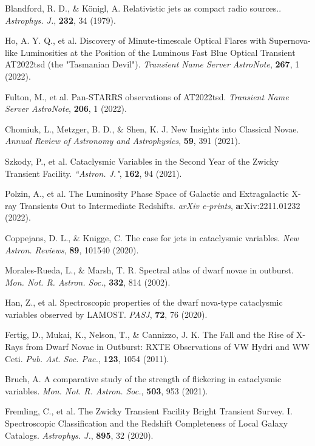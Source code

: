 \documentclass{nature_plusfigure}
\newcommand{\mn}{{Mon. Not. R. Astron. Soc.}}
\newcommand{\nar}{{New Astron. Reviews}}
\newcommand{\mnras}{\mn}
\newcommand{\aj}{{``Astron. J."}}
\newcommand{\apj}{{Astrophys. J.}}
\newcommand{\pasj}{{PASJ}}
\newcommand{\pasp}{{Pub. Ast. Soc. Pac.}}
\newcommand{\araa}{Annual Review of Astronomy and Astrophysics}
\begin{document}
\begin{methods}
\begin{thebibliography}{10}
  Blandford, R. D., \& Königl, A. Relativistic jets as compact radio sources.. \emph{\apj}, \textbf{232}, 34 (1979). 


 Ho, A. Y. Q., et al. Discovery of Minute-timescale Optical Flares with Supernova-like Luminosities at the Position of the Luminous Fast Blue Optical Transient AT2022tsd (the "Tasmanian Devil"). \emph{Transient Name Server AstroNote}, \textbf{267}, 1 (2022). 

 Fulton, M., et al. Pan-STARRS observations of AT2022tsd. \emph{Transient Name Server AstroNote}, \textbf{206}, 1 (2022). 

 Chomiuk, L., Metzger, B. D., \& Shen, K. J. New Insights into Classical Novae. \emph{\araa}, \textbf{59}, 391 (2021). 

 Szkody, P., et al. Cataclysmic Variables in the Second Year of the Zwicky Transient Facility. \emph{\aj}, \textbf{162}, 94 (2021). 

 Polzin, A., et al. The Luminosity Phase Space of Galactic and Extragalactic X-ray Transients Out to Intermediate Redshifts. \emph{arXiv e-prints}, \textbf arXiv:2211.01232 (2022). 

 Coppejans, D. L., \& Knigge, C. The case for jets in cataclysmic variables. \emph{\nar}, \textbf{89}, 101540 (2020). 

 Morales-Rueda, L., \& Marsh, T. R. Spectral atlas of dwarf novae in outburst. \emph{\mnras}, \textbf{332}, 814 (2002). 

 Han, Z., et al. Spectroscopic properties of the dwarf nova-type cataclysmic variables observed by LAMOST. \emph{\pasj}, \textbf{72}, 76 (2020). 

 Fertig, D., Mukai, K., Nelson, T., \& Cannizzo, J. K. The Fall and the Rise of X-Rays from Dwarf Novae in Outburst: RXTE Observations of VW Hydri and WW Ceti. \emph{\pasp}, \textbf{123}, 1054 (2011). 

 Bruch, A. A comparative study of the strength of flickering in cataclysmic variables. \emph{\mnras}, \textbf{503}, 953 (2021). 

 Fremling, C., et al. The Zwicky Transient Facility Bright Transient Survey. I. Spectroscopic Classification and the Redshift Completeness of Local Galaxy Catalogs. \emph{\apj}, \textbf{895}, 32 (2020).


\end{thebibliography}
\end{methods}
\end{document}

